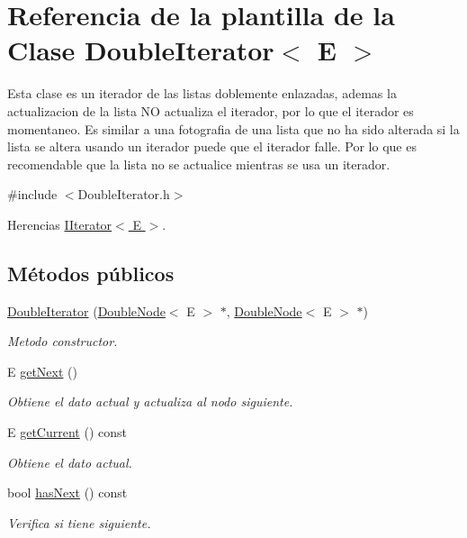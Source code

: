 \hypertarget{classDoubleIterator}{\section{Referencia de la plantilla de la Clase Double\-Iterator$<$ E $>$}
\label{classDoubleIterator}
}


Esta clase es un iterador de las listas doblemente enlazadas, ademas la actualizacion de la lista N\-O actualiza el iterador, por lo que el iterador es momentaneo. Es similar a una fotografia de una lista que no ha sido alterada si la lista se altera usando un iterador puede que el iterador falle. Por lo que es recomendable que la lista no se actualice mientras se usa un iterador.  




{\ttfamily \#include $<$Double\-Iterator.\-h$>$}



Herencias \hyperlink{classIIterator}{I\-Iterator$<$ E $>$}.

\subsection*{Métodos públicos}
\begin{DoxyCompactItemize}
\item 
\hyperlink{classDoubleIterator_a5b45a91dc363462fddcb4965e226e2fc}{Double\-Iterator} (\hyperlink{classDoubleNode}{Double\-Node}$<$ E $>$ $\ast$, \hyperlink{classDoubleNode}{Double\-Node}$<$ E $>$ $\ast$)
\begin{DoxyCompactList}\small\item\em Metodo constructor. \end{DoxyCompactList}\item 
E \hyperlink{classDoubleIterator_aaaa1b361a61339bfee3bf86f3f67b198}{get\-Next} ()
\begin{DoxyCompactList}\small\item\em Obtiene el dato actual y actualiza al nodo siguiente. \end{DoxyCompactList}\item 
E \hyperlink{classDoubleIterator_a756bb08f5352e270e08b72339c32e2be}{get\-Current} () const 
\begin{DoxyCompactList}\small\item\em Obtiene el dato actual. \end{DoxyCompactList}\item 
bool \hyperlink{classDoubleIterator_adb5ef4c66649e0a4ce18e38cd85904ed}{has\-Next} () const 
\begin{DoxyCompactList}\small\item\em Verifica si tiene siguiente. \end{DoxyCompactList}\end{DoxyCompactItemize}

